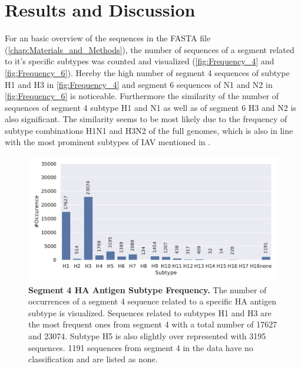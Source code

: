 \chapter{Results and Discussion} \label{chap:Results_and_Discussion}

For an basic overview of the sequences in the FASTA file (\autoref{chap:Materials_and_Methods}), the number of sequences of a segment related to it's specific subtypes was counted and visualized (\autoref{fig:Frequency_4} and \autoref{fig:Frequency_6}). Hereby the high number of segment 4 sequences of subtype H1 and H3 in \autoref{fig:Frequency_4} and segment 6 sequences of N1 and N2 in \autoref{fig:Frequency_6} is noticeable. Furthermore the similarity of the number of sequences of segment 4 subtype H1 and N1 as well as of segment 6 H3 and N2 is also significant. The similarity seems to be most likely due to the frequency of subtype combinations H1N1 and H3N2 of the full genomes, which is also in line with the most prominent subtypes of \gls{IAV} mentioned in \textcite{deng_simplified_2015}. 

\begin{figure}[!hbt]
    \centering
    \includegraphics[width=\textwidth]{PCA/Data_Overview_Segment_4_H.pdf}
    \caption[Segment 4 \Acrlong{HA} Antigen Subtype Frequency]{\textbf{Segment 4 \Acrlong{HA} Antigen Subtype Frequency.} The number of occurrences of a segment 4 sequence related to a specific \gls{HA} antigen subtype is visualized. Sequences related to subtypes H1 and H3 are the most frequent ones from segment 4 with a total number of 17627 and 23074. Subtype H5 is also slightly over represented with 3195 sequences. 1191 sequences from segment 4 in the data have no classification and are listed as \glqq none\grqq{}.}
    \label{fig:Frequency_4}
\end{figure}

